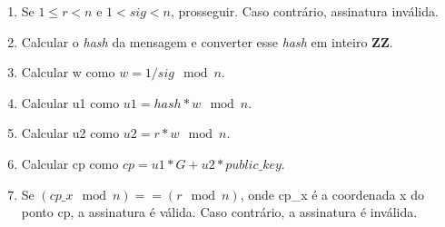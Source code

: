 \documentclass[11pt]{article}
\providecommand{\tightlist}{%
      \setlength{\itemsep}{0pt}\setlength{\parskip}{0pt}}
\begin{document}
\begin{enumerate}
\def\labelenumi{\arabic{enumi}.}
\tightlist
\item
  Se $ 1 \leqslant r < n $ e $ 1 < sig < n $, prosseguir. Caso contrário, assinatura inválida.
\item
  Calcular o \emph{hash} da mensagem e converter esse \emph{hash} em
  inteiro \textbf{ZZ}.
\item
  Calcular w como $ w = 1/sig \mod n $.
\item
  Calcular u1 como $ u1 = hash * w \mod n $.
\item
  Calcular u2 como $ u2 = r * w \mod n $.
\item
  Calcular cp como $ cp = u1 * G + u2 * public\_key $.
\item
  Se $ (cp\_x \mod n) == (r \mod n) $, onde cp\_x é a coordenada x do
  ponto cp, a assinatura é válida. Caso contrário, a assinatura é
  inválida.
\end{enumerate}
\end{document}
